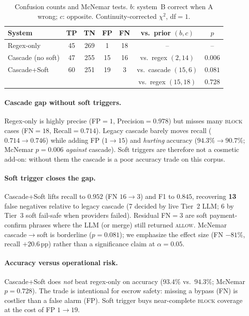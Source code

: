 \documentclass[conference]{IEEEtran}
\begin{document}
\begin{table}[t]
\centering
\caption{Confusion counts and McNemar tests. $b$: system~B correct when A wrong;
$c$: opposite. Continuity-corrected $\chi^{2}$, df$=1$.}
\label{tab:ablation-mcnemar}
\begin{tabular}{lcccccc}
\toprule
System & TP & TN & FP & FN & vs.\ prior $(b,c)$ & $p$ \\
\midrule
Regex-only & 45 & 269 & 1 & 18 & -- & -- \\
Cascade (no soft) & 47 & 255 & 15 & 16 & vs.\ regex $(2,14)$ & $0.006$ \\
Cascade+Soft & 60 & 251 & 19 & 3 & vs.\ cascade $(15,6)$ & $0.081$ \\
 &  &  &  &  & vs.\ regex $(15,18)$ & $0.728$ \\
\bottomrule
\end{tabular}
\end{table}

\paragraph{Cascade gap without soft triggers.}
Regex-only is highly precise (FP$=1$, Precision$=0.978$) but misses many
\textsc{block} cases (FN$=18$, Recall$=0.714$). Legacy cascade barely moves
recall ($0.714\!\rightarrow\!0.746$) while adding FP ($1\!\rightarrow\!15$) and
\emph{hurting} accuracy ($94.3\%\!\rightarrow\!90.7\%$; McNemar $p{=}0.006$
\emph{against} cascade). Soft triggers are therefore not a cosmetic add-on:
without them the cascade is a poor accuracy trade on this corpus.

\paragraph{Soft trigger closes the gap.}
Cascade+Soft lifts recall to $0.952$ (FN $16\!\rightarrow\!3$) and F1 to
$0.845$, recovering \textbf{13} false negatives relative to legacy cascade
(7 decided by live Tier~2 LLM; 6 by Tier~3 soft fail-safe when providers
failed). Residual FN$=3$ are soft payment-confirm phrases where the LLM (or
merge) still returned \textsc{allow}. McNemar cascade$\rightarrow$soft is
borderline ($p{=}0.081$); we emphasize the effect size (FN $-81\%$,
recall $+20.6$\,pp) rather than a significance claim at $\alpha{=}0.05$.

\paragraph{Accuracy versus operational risk.}
Cascade+Soft does \emph{not} beat regex-only on accuracy ($93.4\%$ vs.\
$94.3\%$; McNemar $p{=}0.728$). The trade is intentional for escrow safety:
missing a bypass (FN) is costlier than a false alarm (FP). Soft trigger buys
near-complete \textsc{block} coverage at the cost of FP $1\!\rightarrow\!19$.
\end{document}
